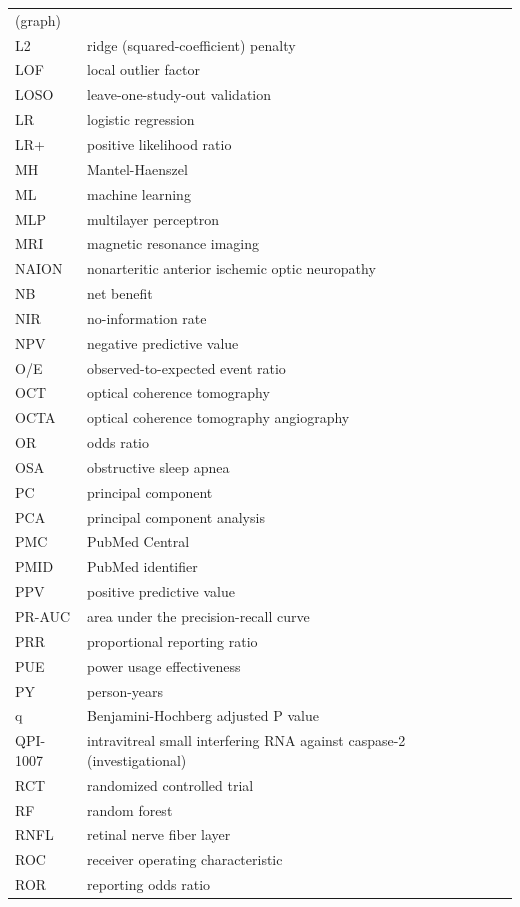 \documentclass[journal]{IEEEtran}
\begin{document}
{\begin{longtable}[]{@{}
  >{\raggedright\arraybackslash}p{}
  >{\raggedright\arraybackslash}p{}@{}}
(graph) \\
L2 & ridge (squared-coefficient) penalty \\
LOF & local outlier factor \\
LOSO & leave-one-study-out validation \\
LR & logistic regression \\
LR+ & positive likelihood ratio \\
MH & Mantel-Haenszel \\
ML & machine learning \\
MLP & multilayer perceptron \\
MRI & magnetic resonance imaging \\
NAION & nonarteritic anterior ischemic optic neuropathy \\
NB & net benefit \\
NIR & no-information rate \\
NPV & negative predictive value \\
O/E & observed-to-expected event ratio \\
OCT & optical coherence tomography \\
OCTA & optical coherence tomography angiography \\
OR & odds ratio \\
OSA & obstructive sleep apnea \\
PC & principal component \\
PCA & principal component analysis \\
PMC & PubMed Central \\
PMID & PubMed identifier \\
PPV & positive predictive value \\
PR-AUC & area under the precision-recall curve \\
PRR & proportional reporting ratio \\
PUE & power usage effectiveness \\
PY & person-years \\
q & Benjamini-Hochberg adjusted P value \\
QPI-1007 & intravitreal small interfering RNA against caspase-2
(investigational) \\
RCT & randomized controlled trial \\
RF & random forest \\
RNFL & retinal nerve fiber layer \\
ROC & receiver operating characteristic \\
ROR & reporting odds ratio \\

\end{longtable}}
\end{document}
